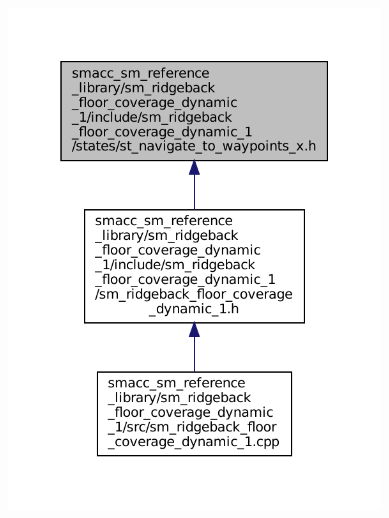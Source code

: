 \begin{figure}[H]
\begin{center}
\leavevmode
\includegraphics[width=280pt]{sm__ridgeback__floor__coverage__dynamic__1_2include_2sm__ridgeback__floor__coverage__dynamic__1_2575c7111309b506798781ee77372f38}
\end{center}
\end{figure}
